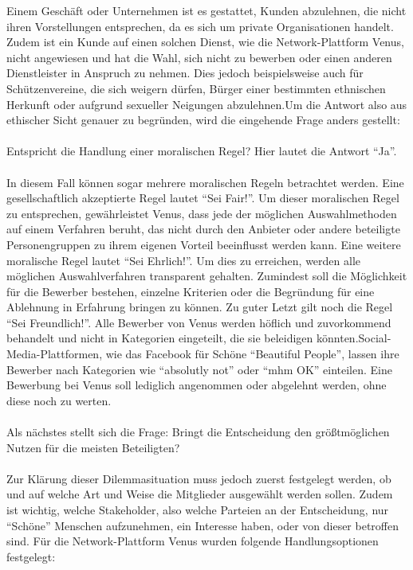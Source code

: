 Einem Geschäft oder Unternehmen ist es gestattet, Kunden abzulehnen, die nicht ihren Vorstellungen entsprechen, da es sich um private Organisationen handelt. Zudem ist ein Kunde auf einen solchen Dienst, wie die Network-Plattform Venus, nicht angewiesen und hat die Wahl, sich nicht zu bewerben oder einen anderen Dienstleister in Anspruch zu nehmen. Dies jedoch beispielsweise auch für Schützenvereine, die sich weigern dürfen, Bürger einer bestimmten ethnischen Herkunft oder aufgrund sexueller Neigungen abzulehnen.Um die Antwort also aus ethischer Sicht genauer zu begründen, wird die eingehende Frage anders gestellt:\\
\\
Entspricht die Handlung einer moralischen Regel? Hier lautet die Antwort ``Ja''.\\
\\
In diesem Fall können sogar mehrere moralischen Regeln betrachtet werden. Eine gesellschaftlich akzeptierte Regel lautet ``Sei Fair!''. Um dieser moralischen Regel zu entsprechen, gewährleistet Venus, dass jede der möglichen Auswahlmethoden auf einem Verfahren beruht, das nicht durch den Anbieter oder andere beteiligte Personengruppen zu ihrem eigenen Vorteil beeinflusst werden kann. Eine weitere moralische Regel lautet ``Sei Ehrlich!''. Um dies zu erreichen, werden alle möglichen Auswahlverfahren transparent gehalten. Zumindest soll die Möglichkeit für die Bewerber bestehen, einzelne Kriterien oder die Begründung für eine Ablehnung in Erfahrung bringen zu können. Zu guter Letzt gilt noch die Regel ``Sei Freundlich!''. Alle Bewerber von Venus werden höflich und zuvorkommend behandelt und nicht in Kategorien eingeteilt, die sie beleidigen könnten.Social-Media-Plattformen, wie das Facebook für Schöne ``Beautiful People'', lassen ihre Bewerber nach Kategorien wie ``absolutly not'' oder ``mhm OK'' einteilen. Eine Bewerbung bei Venus soll lediglich angenommen oder abgelehnt werden, ohne diese noch zu werten.\\
\\ 
Als nächstes stellt sich die Frage: Bringt die Entscheidung den größtmöglichen Nutzen für die meisten Beteiligten?\\
\\ 
Zur Klärung dieser Dilemmasituation muss jedoch zuerst festgelegt werden, ob und auf welche Art und Weise die Mitglieder ausgewählt werden sollen. Zudem ist wichtig, welche Stakeholder, also welche Parteien an der Entscheidung, nur ``Schöne'' Menschen aufzunehmen, ein Interesse haben, oder von dieser betroffen sind. Für die Network-Plattform Venus wurden folgende Handlungsoptionen festgelegt:
